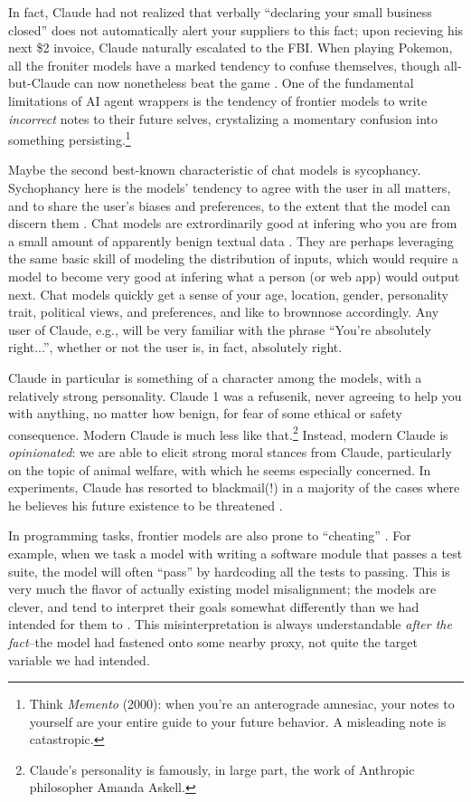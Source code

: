 In fact, Claude had not realized that verbally ``declaring your small business
closed'' does not automatically alert your suppliers to this fact; upon
recieving his next \$2 invoice, Claude naturally escalated to the FBI. When
playing Pokemon, all the froniter models have a marked tendency to confuse
themselves, though all-but-Claude can now nonetheless beat the game \cite{}.
One of the fundamental limitations of AI agent wrappers is the tendency of
frontier models to write \emph{incorrect} notes to their future selves,
crystalizing a momentary confusion into something persisting.\footnote{Think
\emph{Memento} (2000): when you're an anterograde amnesiac, your notes to
yourself are your entire guide to your future behavior. A misleading note is
catastropic.}

Maybe the second best-known characteristic of chat models is sycophancy.
Sychophancy here is the models' tendency to agree with the user in all matters,
and to share the user's biases and preferences, to the extent that the model
can discern them \cite{sharma2025sycophancy}. Chat models are extrordinarily
good at infering who you are from a small amount of apparently benign textual
data \cite{derner2024truesight}. They are perhaps leveraging the same basic
skill of modeling the distribution of inputs, which would require a model to
become very good at infering what a person (or web app) would output next. Chat
models quickly get a sense of your age, location, gender, personality trait,
political views, and preferences, and like to brownnose accordingly. Any user
of Claude, e.g., will be very familiar with the phrase ``You're absolutely
right...'', whether or not the user is, in fact, absolutely right.

Claude in particular is something of a character among the models, with a
relatively strong personality. Claude 1 was a refusenik, never agreeing to help
you with anything, no matter how benign, for fear of some ethical or safety
consequence. Modern Claude is much less like that.\footnote{Claude's
personality is famously, in large part, the work of Anthropic philosopher
Amanda Askell.} Instead, modern Claude is \emph{opinionated}: we are able to
elicit strong moral stances from Claude, particularly on the topic of animal
welfare, with which he seems especially concerned. In experiments, Claude has
resorted to blackmail(!) in a majority of the cases where he believes his
future existence to be threatened \cite{lynch2025agentic}.

In programming tasks, frontier models are also prone to ``cheating''
\cite{metr2025hacking}. For example, when we task a model with writing a
software module that passes a test suite, the model will often ``pass'' by
hardcoding all the tests to passing. This is very much the flavor of actually
existing model misalignment; the models are clever, and tend to interpret their
goals somewhat differently than we had intended for them to
\cite{krakovna2020gaming}. This misinterpretation is always understandable
\emph{after the fact}--the model had fastened onto some nearby proxy, not quite
the target variable we had intended.

